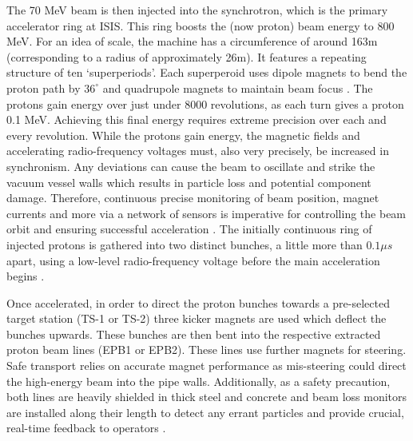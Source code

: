 \documentclass[10pt,oneside]{report}
\begin{document}
The 70 MeV beam is then injected into the synchrotron, which is the primary accelerator ring at ISIS. This ring boosts the (now proton) beam energy to 800 MeV. For an idea of scale, the machine has a circumference of around 163m (corresponding to a radius of approximately 26m). It features a repeating structure of ten `superperiods'. Each superperoid uses dipole magnets to bend the proton path by $36^\circ$ and quadrupole magnets to maintain beam focus \cite{2021practicalguide}. The protons gain energy over just under 8000 revolutions, as each turn gives a proton 0.1 MeV. Achieving this final energy requires extreme precision over each and every revolution. While the protons gain energy, the magnetic fields and accelerating radio-frequency voltages must, also very precisely, be increased in synchronism. Any deviations can cause the beam to oscillate and strike the vacuum vessel walls which results in particle loss and potential component damage. Therefore, continuous precise monitoring of beam position, magnet currents and more via a network of sensors is imperative for controlling the beam orbit and ensuring successful acceleration \cite{2021practicalguide}. The initially continuous ring of injected protons is gathered into two distinct bunches, a little more than $0.1\mu s$ apart, using a low-level radio-frequency voltage before the main acceleration begins \cite{2021practicalguide}.

Once accelerated, in order to direct the proton bunches towards a pre-selected target station (TS-1 or TS-2) three kicker magnets are used which deflect the bunches upwards. These bunches are then bent into the respective extracted proton beam lines (EPB1 or EPB2). These lines use further magnets for steering. Safe transport relies on accurate magnet performance as mis-steering could direct the high-energy beam into the pipe walls. Additionally, as a safety precaution, both lines are heavily shielded in thick steel and concrete and beam loss monitors are installed along their length to detect any errant particles and provide crucial, real-time feedback to operators \cite{2021practicalguide}.
\end{document}
